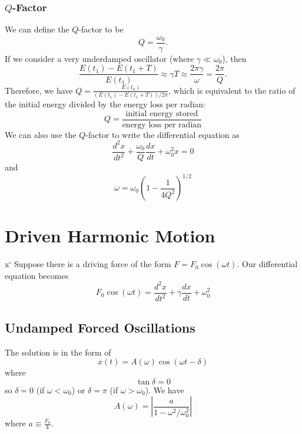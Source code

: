 \documentclass{article}
\begin{document}
\subsubsection{$Q$-Factor}
We can define the $Q$-factor to be 
\begin{equation}
    \boxed{Q = \frac{\omega_0}{\gamma}}.
\end{equation}
If we consider a very underdamped oscillator (where $\gamma \ll \omega_0$), then 
\begin{equation}
    \frac{E(t_1)-E(t_1+T)}{E(t_1)} \approx \gamma T \approx \frac{2\pi \gamma}{\omega} = \frac{2\pi}{Q}.
\end{equation}
Therefore, we have $Q = \frac{E(t_0)}{(E(t_1)-E(t_1+T))/2\pi}$, which is equivalent to the ratio of the initial energy divided by the energy loss per radian: 
\begin{equation}
    \boxed{Q = \frac{\text{initial energy stored}}{\text{energy loss per radian}}}
\end{equation}
We can also use the $Q$-factor to write the differential equation as 
\begin{equation}
    \frac{d^2x}{dt^2}+\frac{\omega_0}{Q}\frac{dx}{dt}+\omega_0^2 x = 0
\end{equation}
and 
\begin{equation}
    \omega = \omega_0\left(1-\frac{1}{4Q^2}\right)^{1/2}
\end{equation}
\newpage
\section{Driven Harmonic Motion}x`
Suppose there is a driving force of the form $F=F_0\cos(\omega t).$ Our differential equation becomes 
\begin{equation}
    F_0\cos(\omega t) = \frac{d^2x}{dt^2}+\gamma \frac{dx}{dt} + \omega_0^2 
\end{equation}
\subsection{Undamped Forced Oscillations}
The solution is in the form of 
\begin{equation}
    x(t) = A(\omega )\cos(\omega t - \delta)
\end{equation}
where 
\begin{equation}
    \tan\delta = 0
\end{equation}
so $\delta = 0$ (if $\omega < \omega_0$) or $\delta = \pi$ (if $\omega > \omega_0$). We have
\begin{equation}
    A(\omega) = \left|\frac{a}{1-\omega^2/\omega_0^2}\right|
\end{equation}
where $a \equiv \frac{F_0}{k}.$
\end{document}
